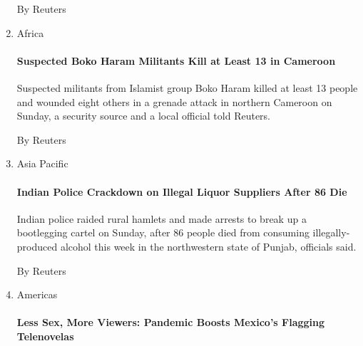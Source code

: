 \begin{enumerate}
  By Reuters
\item
  Africa

  \href{/reuters/2020/08/02/world/africa/02reuters-nigeria-security-boko-haram-cameroon.html?searchResultPosition=6}{}

  \hypertarget{suspected-boko-haram-militants-kill-at-least-13-in-cameroon}{%
  \paragraph{Suspected Boko Haram Militants Kill at Least 13 in
  Cameroon}\label{suspected-boko-haram-militants-kill-at-least-13-in-cameroon}}

  Suspected militants from Islamist group Boko Haram killed at least 13
  people and wounded eight others in a grenade attack in northern
  Cameroon on Sunday, a security source and a local official told
  Reuters.

  By Reuters
\item
  Asia Pacific

  \href{/reuters/2020/08/02/world/asia/02reuters-india-liquor.html?searchResultPosition=7}{}

  \hypertarget{indian-police-crackdown-on-illegal-liquor-suppliers-after-86-die}{%
  \paragraph{Indian Police Crackdown on Illegal Liquor Suppliers After
  86
  Die}\label{indian-police-crackdown-on-illegal-liquor-suppliers-after-86-die}}

  Indian police raided rural hamlets and made arrests to break up a
  bootlegging cartel on Sunday, after 86 people died from consuming
  illegally-produced alcohol this week in the northwestern state of
  Punjab, officials said.

  By Reuters
\item
  Americas

  \href{/2020/08/02/world/americas/mexico-tv-virus-telenovela.html?searchResultPosition=8}{}

  \hypertarget{less-sex-more-viewers-pandemic-boosts-mexicos-flagging-telenovelas}{%
  \paragraph{Less Sex, More Viewers: Pandemic Boosts Mexico's Flagging
  Telenovelas}\label{less-sex-more-viewers-pandemic-boosts-mexicos-flagging-telenovelas}}


\end{enumerate}
